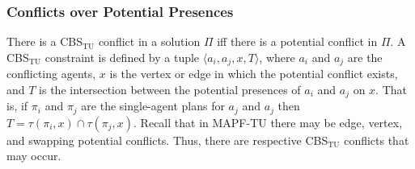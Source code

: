\documentclass[jair,twoside,11pt,theapa]{article}
\newcommand{\tuple}[1]{\langle#1\rangle}
\newcommand{\cbstu}{CBS$\mathrm{_{TU}}$\xspace}
\newcommand{\mapftu}{MAPF-TU\xspace}
\begin{document}

\subsubsection{Conflicts over Potential Presences}
There is a \cbstu conflict in a solution $\Pi$ iff 
there is a potential conflict in $\Pi$.  
A \cbstu constraint is defined by a tuple $\tuple{a_i,a_j,x,T}$, 
where $a_i$ and $a_j$ are the conflicting agents, $x$ is the vertex or edge in which the potential conflict exists, 
and $T$ is the intersection between the potential presences of $a_i$ and $a_j$ on $x$. 
That is, if $\pi_i$ and $\pi_j$ are the single-agent plans for $a_j$ and $a_j$ then 
$T=\tau(\pi_i, x)\cap \tau(\pi_j, x)$. 
Recall that in \mapftu there may be edge, vertex, and swapping potential conflicts. 
Thus, there are respective \cbstu conflicts that may occur.  






\end{document}
